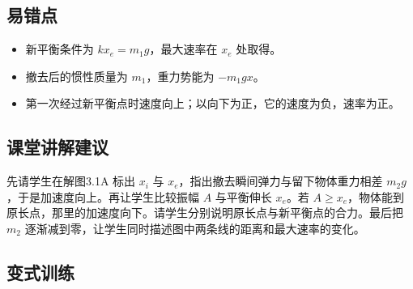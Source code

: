 \documentclass[UTF8,fontset=fandol,a4paper,11pt]{ctexart}
\begin{document}


\subsection*{易错点}

\begin{itemize}
\item 新平衡条件为 $kx_e=m_1g$，最大速率在 $x_e$ 处取得。
\item 撤去后的惯性质量为 $m_1$，重力势能为 $-m_1gx$。
\item 第一次经过新平衡点时速度向上；以向下为正，它的速度为负，速率为正。
\end{itemize}



\subsection*{课堂讲解建议}

先请学生在解图3.1A 标出 $x_i$ 与 $x_e$，指出撤去瞬间弹力与留下物体重力相差 $m_2g$，于是加速度向上。再让学生比较振幅 $A$ 与平衡伸长 $x_e$。若 $A\ge x_e$，物体能到原长点，那里的加速度向下。请学生分别说明原长点与新平衡点的合力。最后把 $m_2$ 逐渐减到零，让学生同时描述图中两条线的距离和最大速率的变化。



\subsection*{变式训练}
\end{document}
